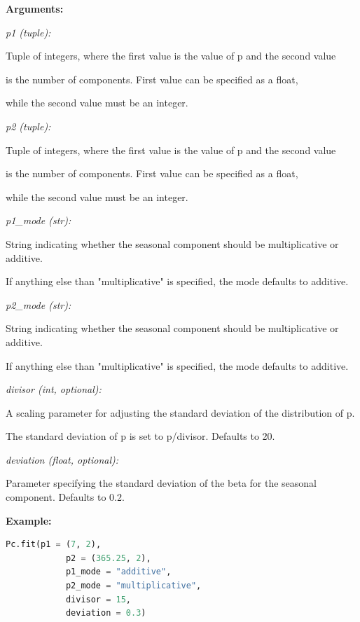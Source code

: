 \documentclass{article}
\begin{document}
\indent \textbf{Arguments:}

\indent \indent \textit{p1 (tuple):} 

\indent \indent \indent Tuple of integers, where the first value is the value of p and the second value

\indent \indent \indent is the number of components. First value can be specified as a float, 

\indent \indent \indent while the second value must be an integer.

\indent \indent \textit{p2 (tuple):} 

\indent \indent \indent Tuple of integers, where the first value is the value of p and the second value

\indent \indent \indent is the number of components. First value can be specified as a float, 

\indent \indent \indent while the second value must be an integer.

\indent \indent \textit{p1\_mode (str):} 

\indent \indent \indent String indicating whether the seasonal component should be
multiplicative or additive. 

\indent \indent \indent If anything else than "multiplicative" is specified,
the mode defaults to additive.

\indent \indent \textit{p2\_mode (str):} 

\indent \indent \indent String indicating whether the seasonal component should be
multiplicative or additive. 

\indent \indent \indent If anything else than "multiplicative" is specified,
the mode defaults to additive.

\indent \indent \textit{divisor (int, optional):} 

\indent \indent \indent A scaling parameter for adjusting the standard deviation of the distribution
of p. 

\indent \indent \indent The standard deviation of p is set to p/divisor. Defaults to 20. 

\indent \indent \textit{deviation (float, optional):} 

\indent \indent \indent Parameter specifying the standard deviation of the beta for the seasonal
component. Defaults to 0.2.

\indent \textbf{Example:}

\begin{lstlisting}[language=Python]
        Pc.fit(p1 = (7, 2), 
            p2 = (365.25, 2), 
            p1_mode = "additive", 
            p2_mode = "multiplicative", 
            divisor = 15, 
            deviation = 0.3)    
\end{lstlisting}
\end{document}
